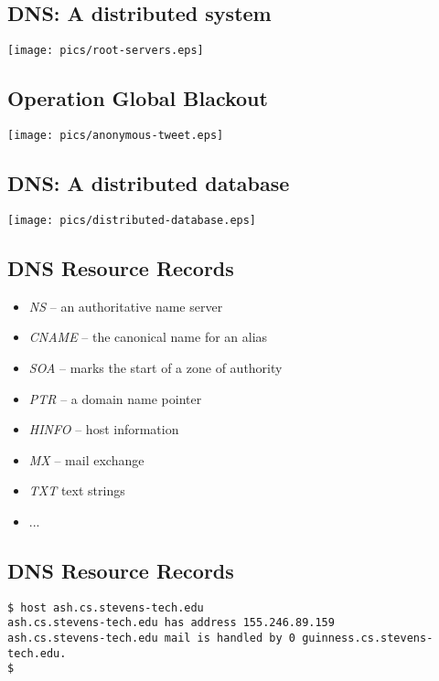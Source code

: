 \documentclass[xga]{xdvislides}
\begin{document}
\subsection{DNS: A distributed system}
\vspace*{\fill}
\begin{center}
	\texttt{[image: pics/root-servers.eps]}
\end{center}
\vspace*{\fill}

\subsection{Operation Global Blackout}
\vspace*{\fill}
\begin{center}
	\texttt{[image: pics/anonymous-tweet.eps]} \\
\end{center}
\vspace*{\fill}

\subsection{DNS: A distributed database}
\vspace*{\fill}
\begin{center}
	\texttt{[image: pics/distributed-database.eps]}
\end{center}
\vspace*{\fill}


\subsection{DNS Resource Records}
\begin{itemize}
	\item {\em NS} -- an authoritative name server
	\item {\em CNAME} -- the canonical name for an alias
	\item {\em SOA} -- marks the start of a zone of authority
	\item {\em PTR} -- a domain name pointer
	\item {\em HINFO} -- host information
	\item {\em MX} -- mail exchange
	\item {\em TXT} text strings
	\item ...
\end{itemize}

\subsection{DNS Resource Records}
\begin{verbatim}
$ host ash.cs.stevens-tech.edu
ash.cs.stevens-tech.edu has address 155.246.89.159
ash.cs.stevens-tech.edu mail is handled by 0 guinness.cs.stevens-tech.edu.
$
\end{verbatim}
\end{document}
